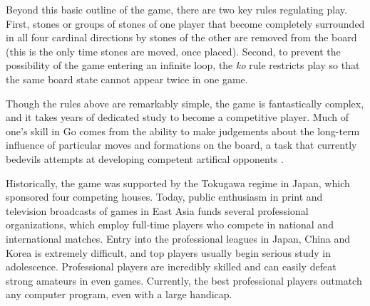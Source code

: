 Beyond this basic outline of the game, there are two key rules regulating play.  First, stones or groups of stones of one player that become completely surrounded in all four cardinal directions by stones of the other are removed from the board (this is the only time stones are moved, once placed).  Second, to prevent the possibility of the game entering an infinite loop, the \textit{ko} rule restricts play so that the same board state cannot appear twice in one game.

Though the rules above are remarkably simple, the game is fantastically complex, and it takes years of dedicated study to become a competitive player.  Much of one's skill in Go comes from the ability to make judgements about the long-term influence of particular moves and formations on the board, a task that currently bedevils attempts at developing competent artifical opponents \citep{Rimmel2010}.

Historically, the game was supported by the Tokugawa regime in Japan, which sponsored four competing houses.  Today, public enthusiasm in print and television broadcasts of games in East Asia funds several professional organizations, which employ full-time players who compete in national and international matches.  Entry into the professional leagues in Japan, China and Korea is extremely difficult, and top players usually begin serious study in adolescence.  Professional players are incredibly skilled and can easily defeat strong amateurs in even games.  Currently, the best professional players outmatch any computer program, even with a large handicap.  


